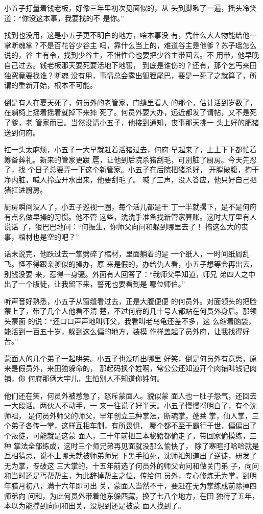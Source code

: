 小五子打量着钱老板，好像三年里初次见面似的，从
头到脚瞅了一遍，摇头冷笑道：“你没这本事，我要找的不
是你。”

找到也没用，这是小五子更不明白的地方，啥本事没
有，凭什么大人物能给他一掌断魂掌？不是百花谷少谷主
吗，靠什么当上的，难道谷主是他爹？苏子瑶怎么说的，谷
主有令，找到少谷主，不惜性命也要把少谷主带回去。不
用带，他早晚自己过去。钱老板那天要死要活地下地窖，
到底是谁伤的？还有，那个乞丐来田独究竟要找谁？断魂
没有用，事情总会露出狐狸尾巴，要是一死了之就算了，所
谓的重新开始，根本不可能。

倒是有人在夏天死了，何员外的老管家，门缝里看人
的那个，估计活到岁数了，在躺椅上摇着摇着就掉下来摔
死了。何员外要大办，远近都发了请帖，又不是死了爹，老
管家而已。当然没请小五子，他接到通知，丧事那天挑一
头上好的肥猪送到何府。

扛一头太麻烦，小五子一大早就赶着活猪过去，何府
早起来了，上上下下都忙着筹备葬礼。新来的管家更跋
扈，让他到后院杀猪刮毛，可别脏了厨房。今天先忍了，找
个日子总要弄一下这个新管家。小五子在后院把猪杀好，
开膛破腹，掏干净内脏，喊人拎壶开水出来，他要刮毛了。
喊了三声，没人答应，他只好自己把猪扛进厨房。

厨房瞬间没人了，小五子巡视一圈，每个活儿都是干
丁一半就撂下，是不是何府有点名做早操的习惯。他不管
这些，洗洗手准备找新管家算账。这时大厅里有人说话
了，狠巴巴地问：“何振生，你师父向问和躲到哪里去了！
搞这么大的丧事，棺材也是空的吧？”

话末说完，他跃过去一掌劈碎了棺材，里面躺着的是
一个纸人，一时间纸屑乱飞。怪不得跟亲爹似的操办，原
来是假的，办给仇人看，小五子想等会再出去，别钱没要
来，惹得一身骚。外面有人回答了：“我师父早知道，师兄
弟四人之中出了一个版徒，让我留下来，誓死也要看到是
哪位师伯。”

听声音好熟悉，小五子从窗缝看过去，正是大腹便便
的何员外。对面领头的把脸蒙上了，带了几个人他看不清
楚，不过何府的几十号人都站在何员外身后。那领头蒙面
的说：“还口口声声地叫师父，我看叫老乌龟还差不多，这
么缩着脑袋，能活到一百五十岁，躲到这么偏的地方，装模
作样盖起了员外府，让我找得好苦。”

蒙面人的几个弟子一起哄笑。小五子也没听出哪里
好笑，倒是何员外有意思，原来是假员外，来田独躲命的，
那起码换个姓啊，常公公还知道开个肉铺叫钱记肉铺，你
何府那俩大宇儿，生怕别人不知道你姓何。

他们还在笑，何员外被惹急了，怒斥蒙面人。貌似蒙
面人也一肚子怨气，还回去一大段话。两伙人不动手，一
来一往说了好半天。小五子慢慢捋明白了，有个沈师祖，
是何员外师父的师父，早年创立三种掌法，断魂掌，蓬莱
掌，仙人掌，三个弟子各传一掌，这样互相车制，有所畏惧，
哪个都不至于霸行于世，偏偏出了个叛徒，可能就是这蒙
面人，二十年前把三本秘籍都偷走了，带回家偷摸练，三种
掌法全部练成，这时三个师兄弟再见面就没那么愉快了，
除了寒暄打哈哈就是互相猜忌，说不上哪天就被师弟师兄
下黑手拍死，沈师祖知道出了逆徒，研发了无为掌，专破这
三大掌的，十五年前选了何员外的师父向问和做关门弟
子，向问和当时还是丐帮帮主，为此辞掉帮主之位，传给何
员外，专心修炼无为掌，到明年腊月初八，满十六年即可出
关，蒙面人当然不干，要赶在无为掌练成前除掉四师弟向
问和，为此何员外带着他东躲西藏，换了七八个地方，在田
独待了五年，本以为能撑到向问和出关，没想到还是被蒙
面人找到了。


